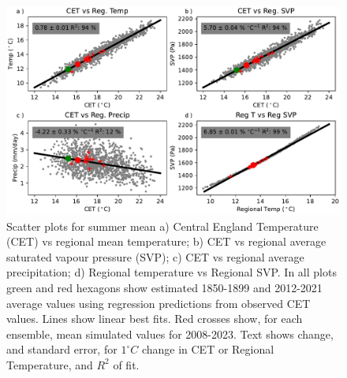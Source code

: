 \documentclass[11pt,a4paper]{article}
\begin{document}
\begin{figure}
	\centering
	\includegraphics[width=\linewidth]{scatter}
	\caption{Scatter plots for summer mean  a)  Central England Temperature (CET) vs  regional mean temperature; b) CET vs regional average saturated vapour pressure (SVP); c) CET vs regional average precipitation; d) Regional temperature vs Regional SVP. In all plots green and red hexagons show estimated 1850-1899 and 2012-2021 average values using regression predictions from observed CET values. Lines show linear best fits. Red crosses show, for each ensemble, mean simulated values for 2008-2023. Text shows  change, and standard error, for  $1^{\circ}C$ change in CET or Regional Temperature, and $R^2$ of fit.}
	\label{fig:cet_scatter}
\end{figure}
\end{document}
